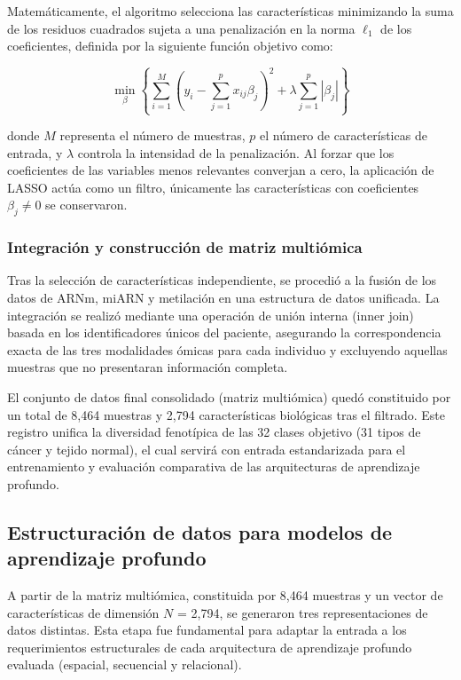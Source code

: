 \documentclass[preprint,number]{elsarticle}
\begin{document}
Matemáticamente, el algoritmo selecciona las características minimizando la suma de los residuos cuadrados sujeta a una penalización en la norma $\ell_1$ de los coeficientes, definida por la siguiente función objetivo como:

\begin{equation}
    \min_{\beta} \left\{ \sum_{i=1}^{M} \left(y_i - \sum_{j=1}^{p} x_{ij}\beta_j\right)^2 + \lambda \sum_{j=1}^{p} |\beta_j| \right\}
\end{equation}

donde $M$ representa el número de muestras, $p$ el número de características de entrada, y $\lambda$ controla la intensidad de la penalización. Al forzar que los coeficientes de las variables menos relevantes converjan a cero, la aplicación de LASSO actúa como un filtro, únicamente las características con coeficientes $\beta_j \neq 0$ se conservaron.

\subsubsection{Integración y construcción de matriz multiómica}

Tras la selección de características independiente, se procedió a la fusión de los datos de ARNm, miARN y metilación en una estructura de datos unificada. La integración se realizó mediante una operación de unión interna (inner join) basada en los identificadores únicos del paciente, asegurando la correspondencia exacta de las tres modalidades ómicas para cada individuo y excluyendo aquellas muestras que no presentaran información completa.

El conjunto de datos final consolidado (matriz multiómica) quedó constituido por un total de 8,464 muestras y 2,794 características biológicas tras el filtrado. Este registro unifica la diversidad fenotípica de las 32 clases objetivo (31 tipos de cáncer y tejido normal), el cual servirá con entrada estandarizada para el entrenamiento y evaluación comparativa de las arquitecturas de aprendizaje profundo.

\subsection{Estructuración de datos para modelos de aprendizaje profundo}

A partir de la matriz multiómica, constituida por 8,464 muestras y un vector de características de dimensión $N$ = 2,794, se generaron tres representaciones de datos distintas. Esta etapa fue fundamental para adaptar la entrada a los requerimientos estructurales de cada arquitectura de aprendizaje profundo evaluada (espacial, secuencial y relacional).
\end{document}
